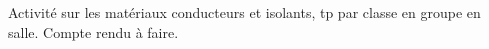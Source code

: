 \begin{myact}{}
	Activité sur les matériaux conducteurs et isolants, tp par classe en groupe en salle. Compte rendu à faire.
\end{myact}